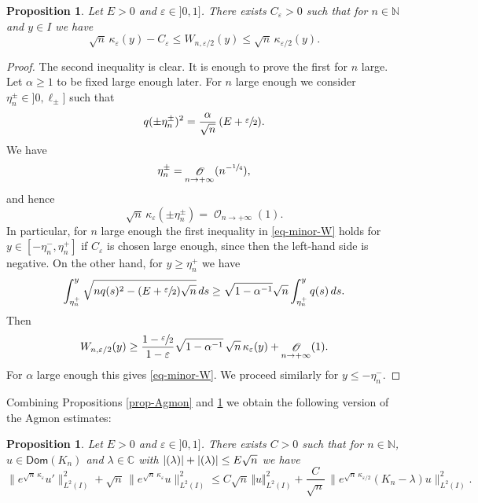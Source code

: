 \documentclass[10pt]{amsart}
\let\mathcal\mathscr
\theoremstyle{plain}
\newtheorem{proposition}[theorem]{Proposition}
\theoremstyle{definition}
\newcommand{\abs}[1]{\vert #1\vert}
\newcommand{\nr}[1]{\Vert #1\Vert}
\newcommand{\inv}{^{-1}}
\newcommand{\1}{\mathds 1}
\let\Re\relax
\DeclareMathOperator{\Re}{\mathsf{Re}\mkern2mu}
\let\Im\relax
\DeclareMathOperator{\Im}{\mathsf{Im}\mkern2mu}
\newcommand{\Dom}{\mathsf{Dom}}
\def\C{\mathbb{C}}
\newcommand{\N}{\mathbb{N}}
\let\a\alpha
\let\e\varepsilon
\let\k\kappa
\let\l\lambda
\newcommand{\Oc}{{\mathcal O}}
\begin{document}
\begin{proposition} \label{prop-W}
Let $E > 0$ and $\e \in{}]0,1]$. There exists $C_\e > 0$ such that for $n \in \N$ and $y \in I$ we have
\begin{equation} \label{eq-minor-W}
\sqrt n\,\kappa_\e (y) - C_\e \leq W_{n,\e/2}(y) \leq \sqrt n\,\kappa_{\e/2}(y) .
\end{equation}
\end{proposition}

\begin{proof}
The second inequality is clear. It is enough to prove the first for $n$ large. Let $\a \geq 1$ to be fixed large enough later. For $n$ large enough we consider $\eta_n^\pm \in{}]0,\ell_\pm]$ such that
\[
q(\pm \eta_n^\pm)^2 = \frac {\a}{\sqrt n}\,(E+ \sfrac \e 2).
\]
We have
\[
\eta_n^\pm = \mathop{\Oc}_{n \to +\infty}(n^{-\sfrac 14}),
\]
and hence
\begin{equation*}
\sqrt n\,\kappa_\e(\pm \eta_n^\pm) = \mathop{\Oc}_{n \to +\infty} (1).
\end{equation*}
In particular, for $n$ large enough the first inequality in \eqref{eq-minor-W} holds for $y \in [-\eta_n^-,\eta_n^+]$ if $C_\e$ is chosen large enough, since then the left-hand side is negative. On the other hand, for $y \geq \eta_n^+$ we have
\begin{align*}
\int_{\eta_n^+}^{y} \sqrt{nq(s)^2 -(E+\sfrac \e 2)\sqrt n} \, ds \geq \sqrt{1-\a \inv } \sqrt n \int_{\eta_n^+}^y q(s) \, ds.
\end{align*}
Then
\[
W_{n,\e/2}(y)
\geq \frac {1-\sfrac \e 2}{1 - \e} \sqrt{1-\a \inv }\, \sqrt n\,\kappa_\e(y) + \mathop{\Oc}_{n \to +\infty} (1).
\]
For $\a$ large enough this gives \eqref{eq-minor-W}. We proceed similarly for $y \leq -\eta_n^-$.
\end{proof}

Combining Propositions \ref{prop-Agmon} and \ref{prop-W} we obtain the following version of the Agmon estimates:

\begin{proposition} \label{prop-psi-L2}
Let $E > 0$ and $\e \in{}]0,1]$. There exists $C > 0$ such that for $n \in \N$, $u \in \Dom(K_n)$ and $\l \in \C$ with $\abs{\Re(\l)} + \abs{\Im(\l)} \leq E \sqrt n$ we have
\begin{equation*}
\big\|e^{\sqrt n\,\kappa_\e} u'\big\|_{L^2(I)}^2 + \sqrt n\,\big\|e^{\sqrt n\,\kappa_\e} u\big\|_{L^2(I)}^2
\leq C \sqrt n\,\nr{u}_{L^2(I)}^2 + \frac {C}{\sqrt n}\, \bigl\|e^{\sqrt n\,\k_{\e/2}} (K_n-\l)u\bigr\|_{L^2(I)}^2.
\end{equation*}
\end{proposition}
\end{document}
